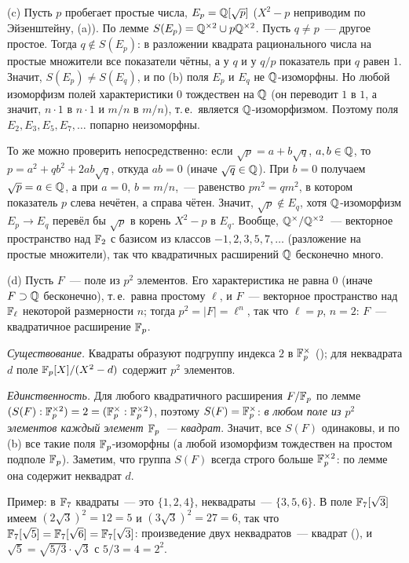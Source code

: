 (c) Пусть $p$ пробегает простые числа, $E_p=\mathbb Q[\sqrt p]$ ($X^2-p$ неприводим по Эйзенштейну, (a)). По лемме
$S(E_p)=\mathbb Q^{\times2}\cup p\mathbb Q^{\times2}$. Пусть $q\ne p$~--- другое простое. Тогда $q\notin S(E_p)$: в разложении квадрата
рационального числа на простые множители все показатели чётны, а у $q$ и у $q/p$ показатель при $q$ равен $1$. Значит,
$S(E_p)\ne S(E_q)$, и по (b) поля $E_p$ и $E_q$ не $\mathbb Q$-изоморфны. Но любой изоморфизм полей характеристики $0$ тождествен
на $\mathbb Q$ (он переводит $1$ в $1$, а значит, $n\cdot1$ в $n\cdot1$ и $m/n$ в $m/n$), т.\,е.\ является $\mathbb Q$-изоморфизмом.
Поэтому поля $E_2,E_3,E_5,E_7,\dots$ попарно неизоморфны.

То же можно проверить непосредственно: если $\sqrt p=a+b\sqrt q$, $a,b\in\mathbb Q$, то $p=a^2+qb^2+2ab\sqrt q$, откуда $ab=0$
(иначе $\sqrt q\in\mathbb Q$). При $b=0$ получаем $\sqrt p=a\in\mathbb Q$, а при $a=0$, $b=m/n$,~--- равенство $pn^2=qm^2$, в котором
показатель $p$ слева нечётен, а справа чётен. Значит, $\sqrt p\notin E_q$, хотя $\mathbb Q$-изоморфизм $E_p\to E_q$ перевёл бы
$\sqrt p$ в корень $X^2-p$ в $E_q$. Вообще, $\mathbb Q^\times/\mathbb Q^{\times2}$~--- векторное пространство над $\mathbb F_2$ с базисом из
классов $-1,2,3,5,7,\dots$ (разложение на простые множители), так что квадратичных расширений $\mathbb Q$ бесконечно много.

(d) Пусть $F$~--- поле из $p^2$ элементов. Его характеристика не равна $0$ (иначе $F\supset\mathbb Q$ бесконечно), т.\,е.\ равна
простому $\ell$, и $F$~--- векторное пространство над $\mathbb F_\ell$ некоторой размерности $n$; тогда $p^2=|F|=\ell^n$, так что
$\ell=p$, $n=2$: $F$~--- квадратичное расширение $\mathbb F_p$.

\emph{Существование.} Квадраты образуют подгруппу индекса $2$ в $\mathbb F_p^\times$ (); для неквадрата $d$ поле
$\mathbb F_p[X]/(X^2-d)$ содержит $p^2$ элементов.

\emph{Единственность.} Для любого квадратичного расширения $F/\mathbb F_p$ по лемме $(S(F):\mathbb F_p^{\times2})=2=(\mathbb F_p^\times:\mathbb F_p^{\times2})$,
поэтому $S(F)=\mathbb F_p^\times$: \emph{в любом поле из $p^2$ элементов каждый элемент $\mathbb F_p$~--- квадрат}. Значит, все $S(F)$
одинаковы, и по (b) все такие поля $\mathbb F_p$-изоморфны (а любой изоморфизм тождествен на простом подполе $\mathbb F_p$). Заметим,
что группа $S(F)$ всегда строго больше $\mathbb F_p^{\times2}$: по лемме она содержит неквадрат $d$.

Пример: в $\mathbb F_7$ квадраты~--- это $\{1,2,4\}$, неквадраты~--- $\{3,5,6\}$. В поле $\mathbb F_7[\sqrt3]$ имеем
$(2\sqrt3)^2=12=5$ и $(3\sqrt3)^2=27=6$, так что $\mathbb F_7[\sqrt5]=\mathbb F_7[\sqrt6]=\mathbb F_7[\sqrt3]$: произведение двух неквадратов~---
квадрат (), и $\sqrt5=\sqrt{5/3}\cdot\sqrt3$ с $5/3=4=2^2$.

